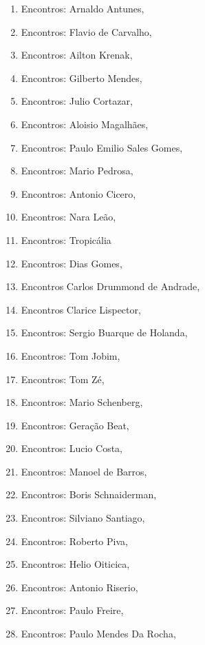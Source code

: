 \begin{multicols}{2}
\begin{enumerate}
\item Encontros: Arnaldo Antunes, {}
\item Encontros: Flavio de Carvalho, {}
\item Encontros: Ailton Krenak, {}
\item Encontros: Gilberto Mendes, {}
\item Encontros: Julio Cortazar, {}
\item Encontros: Aloisio Magalhães, {}
\item Encontros: Paulo Emilio Sales Gomes, {}
\item Encontros: Mario Pedrosa, {}
\item Encontros: Antonio Cicero, {}
\item Encontros: Nara Leão, {}
\item Encontros: Tropicália
\item Encontros: Dias Gomes, {}
\item Encontros Carlos Drummond de Andrade, {}
\item Encontros Clarice Lispector, {}
\item Encontros: Sergio Buarque de Holanda, {}
\item Encontros: Tom Jobim, {}
\item Encontros: Tom Zé, {}
\item Encontros: Mario Schenberg, {}
\item Encontros: Geração Beat, {}
\item Encontros: Lucio Costa, {}
\item Encontros: Manoel de Barros, {}
\item Encontros: Boris Schnaiderman, {}
\item Encontros: Silviano Santiago, {}
\item Encontros: Roberto Piva, {}
\item Encontros: Helio Oiticica, {}
\item Encontros: Antonio Riserio, {}
\item Encontros: Paulo Freire, {}
\item Encontros: Paulo Mendes Da Rocha, {}
\end{enumerate}
\end{multicols}

\pagebreak
